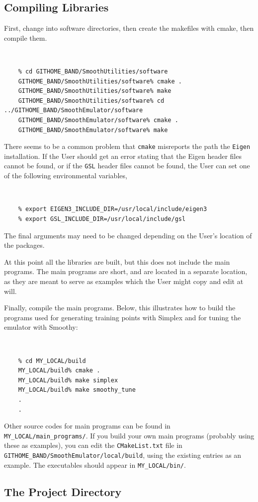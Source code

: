 \documentclass[UserManual.tex]{subfiles}
\begin{document}
\subsection{Compiling Libraries }

First, change into software directories, then create the makefiles with cmake, then compile them.
{\tt 
\begin{verbatim}
    % cd GITHOME_BAND/SmoothUtilities/software
    GITHOME_BAND/SmoothUtilities/software% cmake .
    GITHOME_BAND/SmoothUtilities/software% make
    GITHOME_BAND/SmoothUtilities/software% cd ../GITHOME_BAND/SmoothEmulator/software
    GITHOME_BAND/SmoothEmulator/software% cmake .
    GITHOME_BAND/SmoothEmulator/software% make
\end{verbatim}
}
There seems to be a common problem that {\tt cmake} misreports the path the {\tt Eigen} installation. If the User should get an error stating that the Eigen header files cannot be found, or if the {\tt GSL} header files cannot be found, the User can set one of the following environmental variables,
{\tt 
\begin{verbatim}
    % export EIGEN3_INCLUDE_DIR=/usr/local/include/eigen3
    % export GSL_INCLUDE_DIR=/usr/local/include/gsl
\end{verbatim}
}
The final arguments may need to be changed depending on the User's location of the packages.

At this point all the libraries are built, but this does not include the main programs. The main programs are short, and are located in a separate location, as they are meant to serve as examples which the User might copy and edit at will.

Finally, compile the main programs. Below, this illustrates how to build the programs used for generating training points with Simplex and for tuning the emulator with Smoothy:
{\tt
\begin{verbatim}
    % cd MY_LOCAL/build
    MY_LOCAL/build% cmake .
    MY_LOCAL/build% make simplex
    MY_LOCAL/build% make smoothy_tune
    .
    .
\end{verbatim}
}
Other source codes for main programs can be found in {\tt MY\_LOCAL/main\_programs/}. If you build your own main programs (probably using these as examples), you can edit the {\tt CMakeList.txt} file in {\tt GITHOME\_BAND/SmoothEmulator/local/build}, using the existing entries as an example. The executables should appear in {\tt MY\_LOCAL/bin/}. 

\subsection{The Project Directory}
\end{document}
